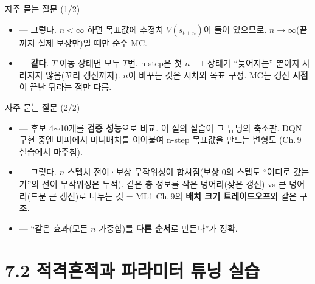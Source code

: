\documentclass[aspectratio=169,11pt]{beamer}
\begin{document}
\begin{frame}{자주 묻는 질문 (1/2)}
  \begin{itemize}
    \item {} --- 그렇다. $n < \infty$
      하면 목표값에 추정치 $V(s_{t+n})$이 들어 있으므로.
      $n\to\infty$(끝까지 실제 보상만)일 때만 순수 MC.
    \item {} --- \textbf{같다}.
      $T$ 이동 상태면 모두 $T$번. n-step은 첫 $n-1$ 상태가 ``늦어지는''
      뿐이지 사라지지 않음(꼬리 갱신까지). $n$이 바꾸는 것은 시차와
      목표 구성. MC는 갱신 \textbf{시점}이 끝난 뒤라는 점만 다름.
  \end{itemize}
\end{frame}

\begin{frame}{자주 묻는 질문 (2/2)}
  \begin{itemize}
    \item {} --- 후보 4$\sim$10개를
      \textbf{검증 성능}으로 비교. 이 절의 실습이 그 튜닝의 축소판.
      DQN 구현 중엔 버퍼에서 미니배치를 이어붙여 n-step 목표값을
      만드는 변형도 (Ch.\,9 실습에서 마주침).
    \item {}
      --- 그렇다. $n$ 스텝치 전이·보상 무작위성이 합쳐짐(보상 0의
      스텝도 ``어디로 갔는가''의 전이 무작위성은 누적). 같은 총
      정보를 작은 덩어리(잦은 갱신) vs 큰 덩어리(드문 큰 갱신)로
      나누는 것 = ML1 Ch.\,9의 \textbf{배치 크기 트레이드오프}와
      같은 구조.
    \item {} --- ``같은
      효과(모든 $n$ 가중합)를 \textbf{다른 순서}로 만든다''가 정확.
  \end{itemize}
\end{frame}

\section{7.2 적격흔적과 파라미터 튜닝 실습}

\end{document}
